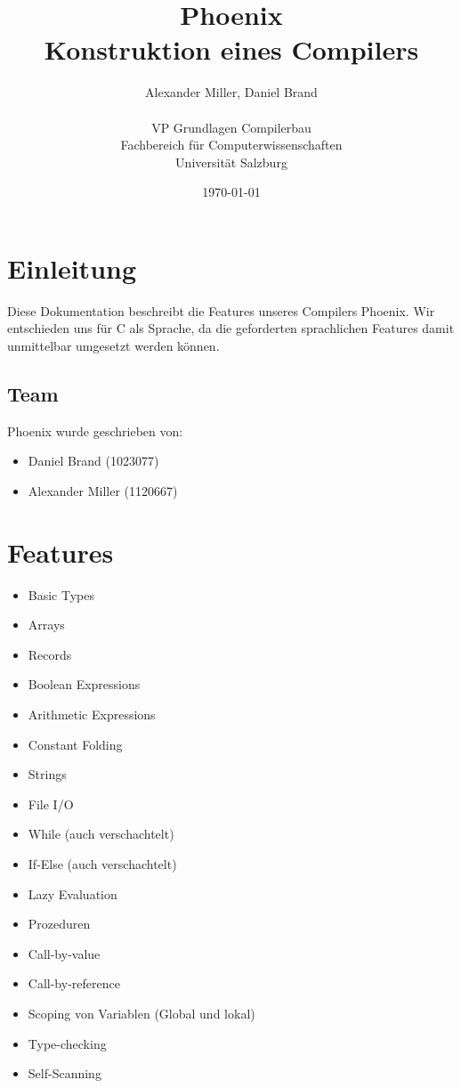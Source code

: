 \documentclass[a4paper,12pt]{article}
\title{Phoenix \\ \large Konstruktion eines Compilers}
\author{Alexander Miller, Daniel Brand \\ \\
		VP Grundlagen Compilerbau \\
		Fachbereich für Computerwissenschaften \\
		Universität Salzburg}
\date{\today}
\begin{document}
	\maketitle
	\tableofcontents
	\newpage

	\section{Einleitung}
	Diese Dokumentation beschreibt die Features unseres Compilers Phoenix.
	Wir entschieden uns für C als Sprache, da die geforderten sprachlichen Features damit unmittelbar umgesetzt werden können.

	\subsection{Team}
	Phoenix wurde geschrieben von:
	\begin{itemize}
		\item Daniel Brand (1023077)
		\item Alexander Miller (1120667)
	\end{itemize}

	\section{Features}
	\begin{multicols}{2}
	\begin{itemize}
		\item Basic Types
		\item Arrays
		\item Records
		\item Boolean Expressions
		\item Arithmetic Expressions
		\item Constant Folding
		\item Strings
		\item File I/O
		\item While (auch verschachtelt)
		\item If-Else (auch verschachtelt)
		\item Lazy Evaluation
		\item Prozeduren
		\item Call-by-value
		\item Call-by-reference
		\item Scoping von Variablen (Global und lokal)
		\item Type-checking
		\item Self-Scanning
	\end{itemize}
	\end{multicols}
\end{document}
